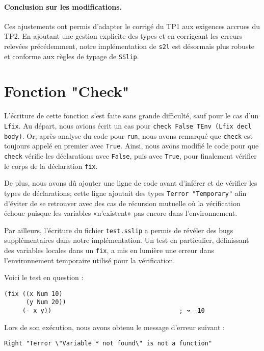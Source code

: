 \documentclass{article}
\begin{document}
\paragraph{Conclusion sur les modifications.}
Ces ajustements ont permis d’adapter le corrigé du TP1 aux exigences accrues du TP2. En ajoutant une gestion explicite des types et en corrigeant les erreurs relevées précédemment, notre implémentation de \texttt{s2l} est désormais plus robuste et conforme aux règles de typage de \texttt{SSlip}.


\section*{Fonction "Check"}
\begin{justify}
L’écriture de cette fonction s’est faite sans grande difficulté, sauf pour le cas
d’un \texttt{Lfix}. Au départ, nous avions écrit un cas pour \texttt{check False TEnv (Lfix decl body)}.
Or, après analyse du code pour \texttt{run}, nous avons remarqué que \texttt{check} est toujours appelé
en premier avec \texttt{True}. Ainsi, nous avons modifié le code pour que \texttt{check} vérifie les déclarations
avec \texttt{False}, puis avec \texttt{True}, pour finalement vérifier le corps de la déclaration \texttt{fix}.
\end{justify}
\begin{justify}
De plus, nous avons dû ajouter une ligne de code avant d’inférer et de vérifier les types
de déclarations; cette ligne ajoutait des types \texttt{Terror "Temporary"} afin d’éviter de se retrouver
avec des cas de récursion mutuelle où la vérification échoue puisque les variables
«n’existent» pas encore dans l’environnement.
\end{justify}
\begin{justify}
Par ailleurs, l’écriture du fichier \texttt{test.sslip} a permis de révéler des bugs supplémentaires dans
notre implémentation. Un test en particulier, définissant des variables locales dans un \texttt{fix},
a mis en lumière une erreur dans l’environnement temporaire utilisé pour la vérification.
\end{justify}
Voici le test en question :
\begin{lstlisting}
(fix ((x Num 10)
      (y Num 20))
     (- x y))                                   ; ↝ -10
\end{lstlisting}

Lors de son exécution, nous avons obtenu le message d’erreur suivant :
\begin{verbatim}
Right "Terror \"Variable * not found\" is not a function"
\end{verbatim}
\end{document}

